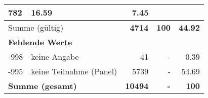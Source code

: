 \begin{longtable}{lXrrr}
       \num{782} &
       \num[round-mode=places,round-precision=2]{16,59} &
         \num[round-mode=places,round-precision=2]{7,45} \\
     \midrule
     \multicolumn{2}{l}{Summe (gültig)} &
       \textbf{\num{4714}} &
     \textbf{100} &
       \textbf{\num[round-mode=places,round-precision=2]{44,92}} \\
     \multicolumn{5}{l}{\textbf{Fehlende Werte}}\\
       -998 &
       keine Angabe &
         \num{41} &
        - &
         \num[round-mode=places,round-precision=2]{0,39} \\
       -995 &
       keine Teilnahme (Panel) &
         \num{5739} &
        - &
         \num[round-mode=places,round-precision=2]{54,69} \\
     \midrule
     \multicolumn{2}{l}{\textbf{Summe (gesamt)}} &
          \textbf{\num{10494}} &
        \textbf{-} &
        \textbf{100} \\
     \bottomrule
     \end{longtable}
     
